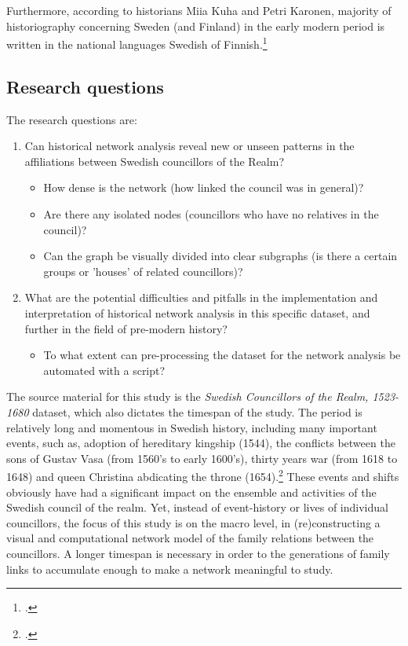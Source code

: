 Furthermore, according to historians Miia Kuha and Petri Karonen, majority of historiography concerning Sweden (and Finland) in the early modern period is written in the national languages Swedish of Finnish.\footcite[p. 6.]{kuha-ja-karonen} 

\subsection{Research questions}
The research questions are:
\begin{enumerate}
	\item Can historical network analysis reveal new or unseen patterns in the affiliations between Swedish councillors of the Realm? \begin{itemize}
		\item How dense is the network (how linked the council was in general)?
		\item Are there any isolated nodes (councillors who have no relatives in the council)?
		\item Can the graph be visually divided into clear subgraphs (is there a certain groups or 'houses' of related councillors)?
	\end{itemize}	
	\item What are the potential difficulties and pitfalls in the implementation and interpretation of historical network analysis in this specific dataset, and further in the field of pre-modern history? \begin{itemize}	
		\item To what extent can pre-processing the dataset for the network analysis be automated with a script?
	\end{itemize}
\end{enumerate} 

The source material for this study is the \textit{Swedish Councillors of the Realm, 1523-1680} dataset, which also dictates the timespan of the study. The period is relatively long and momentous in Swedish history, including many important events, such as, adoption of hereditary kingship (1544), the conflicts between the sons of Gustav Vasa (from 1560's to early 1600's), thirty years war (from 1618 to 1648) and queen Christina abdicating the throne (1654).\footcite[p. 8-9.]{personalAgency} These events and shifts obviously have had a significant impact on the ensemble and activities of the Swedish council of the realm. Yet, instead of event-history or lives of individual councillors, the focus of this study is on the macro level, in (re)constructing a visual and computational network model of the family relations between the councillors. A longer timespan is necessary in order to the generations of family links to accumulate enough to make a network meaningful to study.

